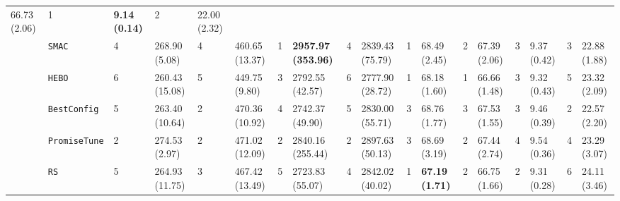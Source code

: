 \begin{tabular}{clllllllllllllllll}
  \multicolumn{1}{l|}{\cellcolor{blue!15}66.73 (2.06)} &
  \cellcolor{blue!15}1 &
  \multicolumn{1}{l|}{\cellcolor{blue!15}\textbf{9.14 (0.14)}} &
  2 &
  22.00 (2.32) \\
\multicolumn{1}{c|}{} &
  \multicolumn{1}{l|}{\texttt{SMAC}} &
  4 &
  \multicolumn{1}{l|}{268.90 (5.08)} &
  4 &
  \multicolumn{1}{l|}{460.65 (13.37)} &
  \cellcolor{blue!15}1 &
  \multicolumn{1}{l|}{\cellcolor{blue!15}\textbf{2957.97 (353.96)}} &
  4 &
  \multicolumn{1}{l|}{2839.43 (75.79)} &
  \cellcolor{blue!15}1 &
  \multicolumn{1}{l|}{\cellcolor{blue!15}68.49 (2.45)} &
  2 &
  \multicolumn{1}{l|}{67.39 (2.06)} &
  3 &
  \multicolumn{1}{l|}{9.37 (0.42)} &
  3 &
  22.88 (1.88) \\
\multicolumn{1}{c|}{} &
  \multicolumn{1}{l|}{\texttt{HEBO}} &
  6 &
  \multicolumn{1}{l|}{260.43 (15.08)} &
  5 &
  \multicolumn{1}{l|}{449.75 (9.80)} &
  3 &
  \multicolumn{1}{l|}{2792.55 (42.57)} &
  6 &
  \multicolumn{1}{l|}{2777.90 (28.72)} &
  \cellcolor{blue!15}1 &
  \multicolumn{1}{l|}{\cellcolor{blue!15}68.18 (1.60)} &
  \cellcolor{blue!15}1 &
  \multicolumn{1}{l|}{\cellcolor{blue!15}66.66 (1.48)} &
  3 &
  \multicolumn{1}{l|}{9.32 (0.43)} &
  5 &
  23.32 (2.09) \\
\multicolumn{1}{c|}{} &
  \multicolumn{1}{l|}{\texttt{BestConfig}} &
  5 &
  \multicolumn{1}{l|}{263.40 (10.64)} &
  2 &
  \multicolumn{1}{l|}{470.36 (10.92)} &
  4 &
  \multicolumn{1}{l|}{2742.37 (49.90)} &
  5 &
  \multicolumn{1}{l|}{2830.00 (55.71)} &
  3 &
  \multicolumn{1}{l|}{68.76 (1.77)} &
  3 &
  \multicolumn{1}{l|}{67.53 (1.55)} &
  3 &
  \multicolumn{1}{l|}{9.46 (0.39)} &
  2 &
  22.57 (2.20) \\
\multicolumn{1}{c|}{} &
  \multicolumn{1}{l|}{\texttt{PromiseTune}} &
  2 &
  \multicolumn{1}{l|}{274.53 (2.97)} &
  2 &
  \multicolumn{1}{l|}{471.02 (12.09)} &
  2 &
  \multicolumn{1}{l|}{2840.16 (255.44)} &
  2 &
  \multicolumn{1}{l|}{2897.63 (50.13)} &
  3 &
  \multicolumn{1}{l|}{68.69 (3.19)} &
  2 &
  \multicolumn{1}{l|}{67.44 (2.74)} &
  4 &
  \multicolumn{1}{l|}{9.54 (0.36)} &
  4 &
  23.29 (3.07) \\
\multicolumn{1}{c|}{} &
  \multicolumn{1}{l|}{\texttt{RS}} &
  5 &
  \multicolumn{1}{l|}{264.93 (11.75)} &
  3 &
  \multicolumn{1}{l|}{467.42 (13.49)} &
  5 &
  \multicolumn{1}{l|}{2723.83 (55.07)} &
  4 &
  \multicolumn{1}{l|}{2842.02 (40.02)} &
  \cellcolor{blue!15}1 &
  \multicolumn{1}{l|}{\cellcolor{blue!15}\textbf{67.19 (1.71)}} &
  2 &
  \multicolumn{1}{l|}{66.75 (1.66)} &
  2 &
  \multicolumn{1}{l|}{9.31 (0.28)} &
  6 &
  24.11 (3.46) \\

\end{tabular}
